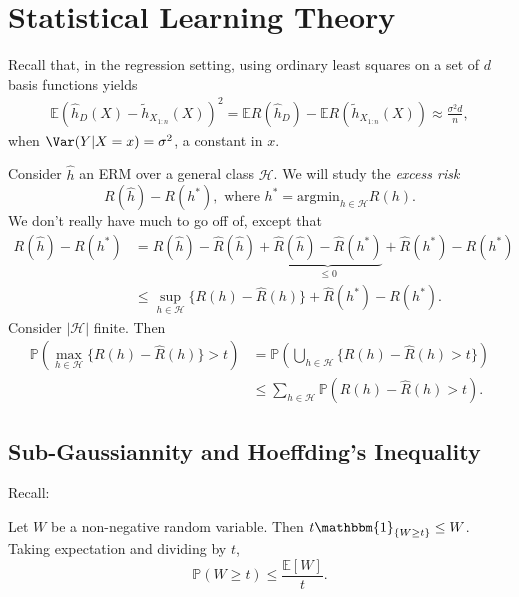 \documentclass[12pt]{article}
\begin{document}

\newpage

\section{Statistical Learning Theory}
\label{sec:slt}

Recall that, in the regression setting, using ordinary least squares on a set of $d$ basis functions yields
\begin{align*}
	\mathbb{E}(\hat h_D(X) - \tilde h_{X_{1:n}}(X))^2 = \mathbb{E}R(\hat h_D) - \mathbb{E} R(\tilde h_{X_{1:n}}(X)) \approx \frac{\sigma^2 d}{n},
\end{align*}
when $\Var(Y|X = x) =\sigma^2$, a constant in $x$.

Consider $\hat h$ an ERM over a general class $\mathcal{H}$. We will study the \emph{excess risk}
\[
	R(\hat h) - R(h^\ast), \text{ where } h^\ast = \mathrm{argmin}_{h \in \mathcal{H}}R(h).
\]
We don't really have much to go off of, except that
\begin{align*}
	R(\hat h) - R(h^\ast) &= R(\hat h) - \hat R(\hat h) + \underbrace{\hat R(\hat h) - \hat R(h^\ast)}_{\leq 0} + \hat R(h^\ast)- R(h^\ast) \\
			      &\leq \sup_{h \in \mathcal{H}}\{ R(h) - \hat R(h)\} + \hat R(h^\ast) - R(h^\ast).
\end{align*}
Consider $|\mathcal{H}|$ finite. Then
\begin{align*}
	\mathbb{P} \left( \max_{h \in \mathcal{H}} \{R(h) - \hat R(h)\} > t \right) &= \mathbb{P} \left( \bigcup_{h \in \mathcal{H}} \{R(h) - \hat R(h) > t\} \right) \\
										    &\leq \sum_{h \in \mathcal{H}} \mathbb{P}(R(h) - \hat R(h) > t).
\end{align*}

\subsection{Sub-Gaussiannity and Hoeffding's Inequality}
\label{sub:sub_g_h_ineq}

Recall:

\begin{proposition}
	Let $W$ be a non-negative random variable. Then $t \mathbbm{1}_{\{W \geq t\}} \leq W$. Taking expectation and dividing by $t$,
	\[
	\mathbb{P}(W \geq t) \leq \frac{\mathbb{E}[W]}{t}.
	\]
\end{proposition}
\end{document}
